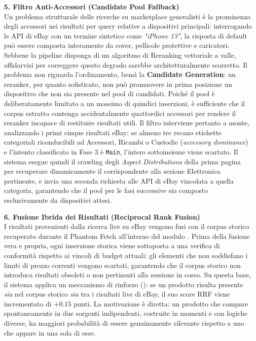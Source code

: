 \vspace{0.4cm}
\noindent
\textbf{5. Filtro Anti-Accessori (Candidate Pool Fallback)}\\
Un problema strutturale delle ricerche su marketplace generalisti è la prominenza degli accessori nei risultati per query relative a dispositivi principali: interrogando le API di eBay con un termine sintetico come \emph{"iPhone 13"}, la risposta di default può essere composta interamente da cover, pellicole protettive e caricatori.
Sebbene la pipeline disponga di un algoritmo di Reranking vettoriale a valle, affidarvisi per correggere questo degrado sarebbe architetturalmente scorretto. Il problema non riguarda l'ordinamento, bensì la \textbf{Candidate Generation}: un reranker, per quanto sofisticato, non può promuovere in prima posizione un dispositivo che non sia presente nel pool di candidati. Poiché il pool è deliberatamente limitato a un massimo di quindici inserzioni, è sufficiente che il corpus estratto contenga accidentalmente quattordici accessori per rendere il reranker incapace di restituire risultati utili.
Il filtro interviene pertanto a monte, analizzando i primi cinque risultati eBay: se almeno tre recano etichette categoriali riconducibili ad Accessori, Ricambi o Custodie (\emph{accessory dominance}) e l'intento classificato in Fase 3 è \texttt{Main}, l'intero sottoinsieme viene scartato. Il sistema esegue quindi il crawling degli \emph{Aspect Distributions} della prima pagina per recuperare dinamicamente il  corrispondente alla sezione Elettronica pertinente, e invia una seconda richiesta alle API di eBay vincolata a quella categoria, garantendo che il pool per le fasi successive sia composto esclusivamente da dispositivi attesi.

\vspace{0.4cm}
\noindent
\textbf{6. Fusione Ibrida dei Risultati (Reciprocal Rank Fusion)}\\
I risultati provenienti dalla ricerca live su eBay vengono fusi con
il corpus storico recuperato durante il Phantom Fetch all'interno
del modulo . Prima della
fusione vera e propria, ogni inserzione storica viene sottoposta a
una verifica di conformità rispetto ai vincoli di budget attuali:
gli elementi che non soddisfano i limiti di prezzo correnti vengono
scartati, garantendo che il corpus storico non introduca risultati
obsoleti o non pertinenti alla sessione in corso.
Su questa base, il sistema applica un meccanismo di rinforzo
(): se un prodotto risulta presente \emph{sia} nel
corpus storico \emph{sia} tra i risultati live di eBay, il suo score RRF
viene incrementato di \(+0.15\) punti. La motivazione è diretta: un
prodotto che compare spontaneamente in due sorgenti indipendenti,
costruite in momenti e con logiche diverse, ha maggiori probabilità
di essere genuinamente rilevante rispetto a uno che appare in una sola di esse.

